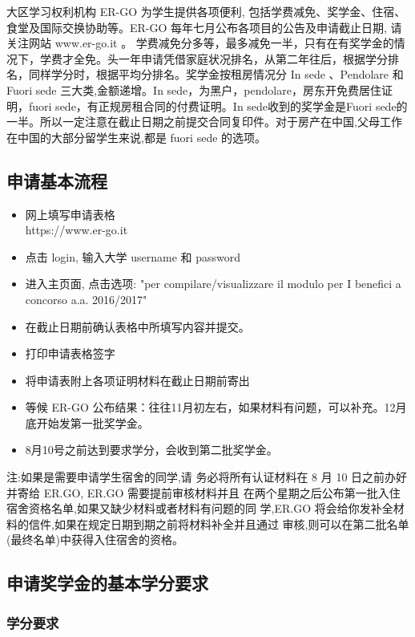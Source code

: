 \documentclass[3pt,a5paper,openright,twoside]{book}
\begin{document}
大区学习权利机构 ER-GO 为学生提供各项便利, 包括学费减免、奖学金、住宿、食堂及国际交换协助等。ER-GO 每年七月公布各项目的公告及申请截止日期, 请关注网站 www.er-go.it 。 
学费减免分多等，最多减免一半，只有在有奖学金的情况下，学费才全免。头一年申请凭借家庭状况排名，从第二年往后，根据学分排名，同样学分时，根据平均分排名。奖学金按租房情况分 In sede 、Pendolare 和 Fuori sede 三大类,金额递增。In sede，为黑户，pendolare，房东开免费居住证明，fuori sede，有正规房租合同的付费证明。In sede收到的奖学金是Fuori sede的一半。所以一定注意在截止日期之前提交合同复印件。对于房产在中国,父母工作在中国的大部分留学生来说,都是 fuori sede 的选项。

\subsection{申请基本流程}
\begin{itemize}
 \item 网上填写申请表格 \\https://www.er-go.it
 \item 点击 login, 输入大学 username 和 password
 \item 进入主页面, 点击选项: "per compilare/visualizzare il modulo per I benefici a concorso a.a.
2016/2017"
 \item 在截止日期前确认表格中所填写内容并提交。
 \item 打印申请表格签字 
 \item 将申请表附上各项证明材料在截止日期前寄出 
 \item 等候 ER-GO 公布结果：往往11月初左右，如果材料有问题，可以补充。12月底开始发第一批奖学金。
 \item 8月10号之前达到要求学分，会收到第二批奖学金。
\end{itemize}
注:如果是需要申请学生宿舍的同学,请
务必将所有认证材料在 8 月 10 日之前办好并寄给 ER.GO, ER.GO 需要提前审核材料并且 在两个星期之后公布第一批入住宿舍资格名单,如果又缺少材料或者材料有问题的同 学,ER.GO 将会给你发补全材料的信件,如果在规定日期到期之前将材料补全并且通过 审核,则可以在第二批名单(最终名单)中获得入住宿舍的资格。

\subsection{申请奖学金的基本学分要求}

\subsubsection{学分要求}
\end{document}
